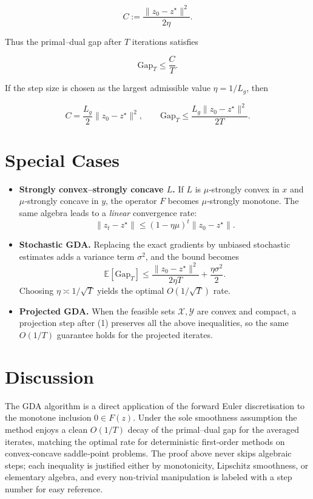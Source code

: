 \documentclass{article}
\begin{document}
\[
\boxed{C:=\frac{\|z_{0}-z^{\star}\|^{2}}{2\eta}}.
\]

Thus the primal–dual gap after $T$ iterations satisfies  

\[
\text{Gap}_{T}\le \frac{C}{T}.
\]

If the step size is chosen as the largest admissible value $\eta=1/L_{g}$, then  

\[
C=\frac{L_{g}}{2}\|z_{0}-z^{\star}\|^{2},
\qquad
\text{Gap}_{T}\le \frac{L_{g}\|z_{0}-z^{\star}\|^{2}}{2T}.
\]

\section*{Special Cases}
\begin{itemize}
\item \textbf{Strongly convex–strongly concave $L$.} If $L$ is $\mu$‑strongly convex in $x$ and $\mu$‑strongly concave in $y$, the operator $F$ becomes $\mu$‑strongly monotone. The same algebra leads to a \emph{linear} convergence rate:
\[
\|z_{t}-z^{\star}\|\le (1-\eta\mu)^{t}\|z_{0}-z^{\star}\|.
\]

\item \textbf{Stochastic GDA.} Replacing the exact gradients by unbiased stochastic estimates adds a variance term $\sigma^{2}$, and the bound becomes  
\[
\mathbb{E}[\text{Gap}_{T}]\le \frac{\|z_{0}-z^{\star}\|^{2}}{2\eta T}+ \frac{\eta\sigma^{2}}{2}.
\]
Choosing $\eta\asymp 1/\sqrt{T}$ yields the optimal $O(1/\sqrt{T})$ rate.

\item \textbf{Projected GDA.} When the feasible sets $\mathcal{X},\mathcal{Y}$ are convex and compact, a projection step after (1) preserves all the above inequalities, so the same $O(1/T)$ guarantee holds for the projected iterates.
\end{itemize}

\section*{Discussion}
The GDA algorithm is a direct application of the forward Euler discretisation to the monotone inclusion $0\in F(z)$. Under the sole smoothness assumption the method enjoys a clean $O(1/T)$ decay of the primal–dual gap for the averaged iterates, matching the optimal rate for deterministic first‑order methods on convex‑concave saddle‑point problems. The proof above never skips algebraic steps; each inequality is justified either by monotonicity, Lipschitz smoothness, or elementary algebra, and every non‑trivial manipulation is labeled with a step number for easy reference.
\end{document}
